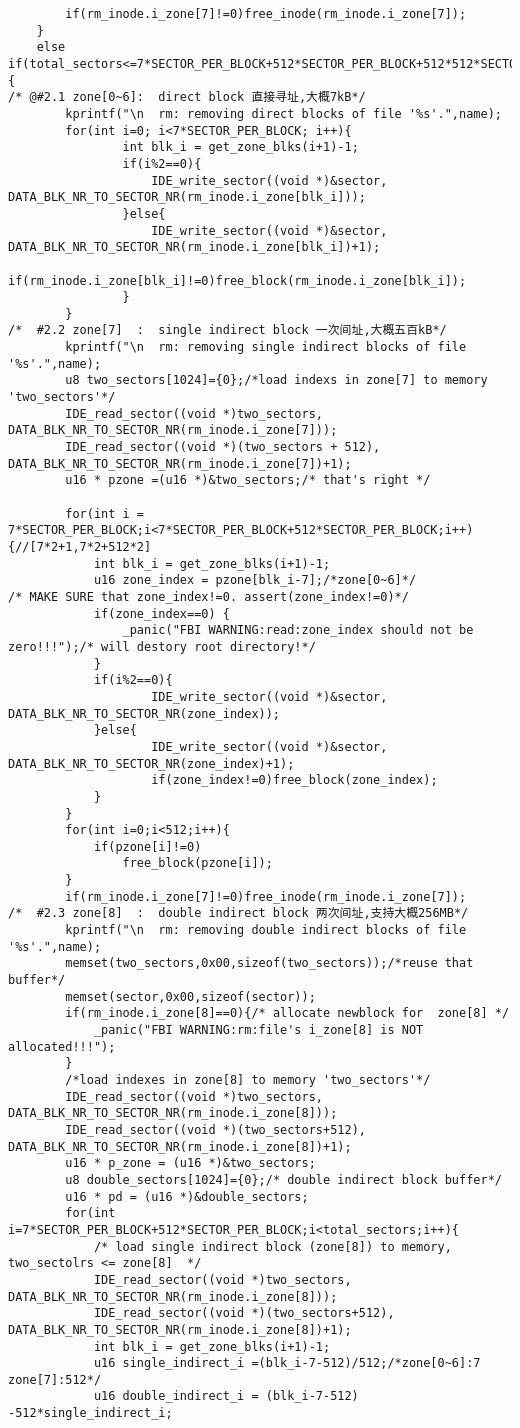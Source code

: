 \begin{verbatim}
		if(rm_inode.i_zone[7]!=0)free_inode(rm_inode.i_zone[7]);
	}
	else if(total_sectors<=7*SECTOR_PER_BLOCK+512*SECTOR_PER_BLOCK+512*512*SECTOR_PER_BLOCK){
/* @#2.1 zone[0~6]:  direct block 直接寻址,大概7kB*/	
		kprintf("\n  rm: removing direct blocks of file '%s'.",name);
		for(int i=0; i<7*SECTOR_PER_BLOCK; i++){
				int blk_i = get_zone_blks(i+1)-1;
				if(i%2==0){
					IDE_write_sector((void *)&sector, DATA_BLK_NR_TO_SECTOR_NR(rm_inode.i_zone[blk_i]));
				}else{
					IDE_write_sector((void *)&sector, DATA_BLK_NR_TO_SECTOR_NR(rm_inode.i_zone[blk_i])+1);	
					if(rm_inode.i_zone[blk_i]!=0)free_block(rm_inode.i_zone[blk_i]);
				}
		}
/*  #2.2 zone[7]  :  single indirect block 一次间址,大概五百kB*/
		kprintf("\n  rm: removing single indirect blocks of file '%s'.",name);
		u8 two_sectors[1024]={0};/*load indexs in zone[7] to memory 'two_sectors'*/
		IDE_read_sector((void *)two_sectors, DATA_BLK_NR_TO_SECTOR_NR(rm_inode.i_zone[7]));
		IDE_read_sector((void *)(two_sectors + 512), DATA_BLK_NR_TO_SECTOR_NR(rm_inode.i_zone[7])+1);
		u16 * pzone =(u16 *)&two_sectors;/* that's right */

		for(int i = 7*SECTOR_PER_BLOCK;i<7*SECTOR_PER_BLOCK+512*SECTOR_PER_BLOCK;i++){//[7*2+1,7*2+512*2]
			int blk_i = get_zone_blks(i+1)-1;
			u16 zone_index = pzone[blk_i-7];/*zone[0~6]*/
/* MAKE SURE that zone_index!=0. assert(zone_index!=0)*/			
			if(zone_index==0) {
				_panic("FBI WARNING:read:zone_index should not be zero!!!");/* will destory root directory!*/			
			}
			if(i%2==0){
					IDE_write_sector((void *)&sector, DATA_BLK_NR_TO_SECTOR_NR(zone_index));
			}else{
					IDE_write_sector((void *)&sector, DATA_BLK_NR_TO_SECTOR_NR(zone_index)+1);
					if(zone_index!=0)free_block(zone_index);
			}
		}
		for(int i=0;i<512;i++){
			if(pzone[i]!=0)
				free_block(pzone[i]);
		}
		if(rm_inode.i_zone[7]!=0)free_inode(rm_inode.i_zone[7]);
/*  #2.3 zone[8]  :  double indirect block 两次间址,支持大概256MB*/
		kprintf("\n  rm: removing double indirect blocks of file '%s'.",name);
		memset(two_sectors,0x00,sizeof(two_sectors));/*reuse that buffer*/
		memset(sector,0x00,sizeof(sector));
		if(rm_inode.i_zone[8]==0){/* allocate newblock for  zone[8] */
			_panic("FBI WARNING:rm:file's i_zone[8] is NOT allocated!!!"); 
		}
		/*load indexes in zone[8] to memory 'two_sectors'*/
		IDE_read_sector((void *)two_sectors, DATA_BLK_NR_TO_SECTOR_NR(rm_inode.i_zone[8]));
		IDE_read_sector((void *)(two_sectors+512), DATA_BLK_NR_TO_SECTOR_NR(rm_inode.i_zone[8])+1);
		u16 * p_zone = (u16 *)&two_sectors;
		u8 double_sectors[1024]={0};/* double indirect block buffer*/
		u16 * pd = (u16 *)&double_sectors;
		for(int i=7*SECTOR_PER_BLOCK+512*SECTOR_PER_BLOCK;i<total_sectors;i++){
			/* load single indirect block (zone[8]) to memory, two_sectolrs <= zone[8]  */			
			IDE_read_sector((void *)two_sectors, DATA_BLK_NR_TO_SECTOR_NR(rm_inode.i_zone[8]));
			IDE_read_sector((void *)(two_sectors+512), DATA_BLK_NR_TO_SECTOR_NR(rm_inode.i_zone[8])+1);
			int blk_i = get_zone_blks(i+1)-1;
			u16 single_indirect_i =(blk_i-7-512)/512;/*zone[0~6]:7 zone[7]:512*/
			u16 double_indirect_i = (blk_i-7-512) -512*single_indirect_i;


\end{verbatim}
